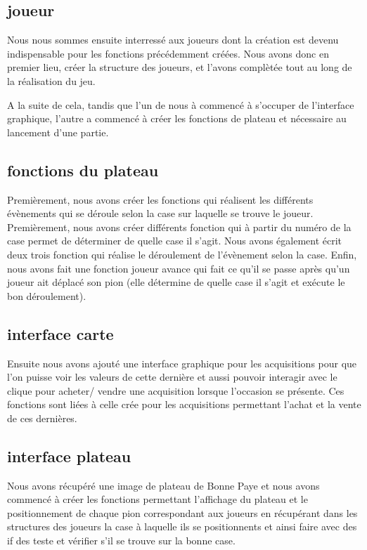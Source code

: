 \documentclass[a4paper, 11pt]{report}
\begin{document}
\subsection{joueur}
Nous nous sommes ensuite interressé aux joueurs dont la création est devenu indispensable pour les fonctions précédemment créées.
Nous avons donc en premier lieu, créer la structure des joueurs, et l'avons complètée tout au long de la réalisation du jeu.

A la suite de cela, tandis que l'un de nous à commencé à s'occuper de l'interface graphique, l'autre a commencé à créer les fonctions de plateau et nécessaire au lancement d'une partie.

\subsection{fonctions du plateau}
Premièrement, nous avons créer les fonctions qui réalisent les différents évènements qui se déroule selon la case sur laquelle se trouve le joueur. Premièrement, nous avons créer différents fonction qui à partir du numéro de la case permet de déterminer de quelle case il s'agit. Nous avons également écrit deux trois fonction qui réalise le déroulement de l'évènement selon la case. Enfin, nous avons fait une fonction joueur avance qui fait ce qu'il se passe après qu'un joueur ait déplacé son pion (elle détermine de quelle case il s'agit et exécute le bon déroulement).


\subsection{interface carte}

Ensuite nous avons ajouté une interface graphique pour les acquisitions pour que l'on puisse voir les valeurs de cette dernière et aussi pouvoir interagir avec le clique pour acheter/ vendre une acquisition lorsque l'occasion se présente. Ces fonctions sont liées à celle crée pour les acquisitions permettant l'achat et la vente de ces dernières.




\subsection{interface plateau}

Nous avons récupéré une image de plateau de Bonne Paye et nous avons commencé à créer les fonctions permettant l'affichage du plateau et le positionnement de chaque pion correspondant aux joueurs en récupérant dans les structures des joueurs la case à laquelle ils se positionnents et ainsi faire avec des if des teste et vérifier s'il se trouve sur la bonne case.
\end{document}
